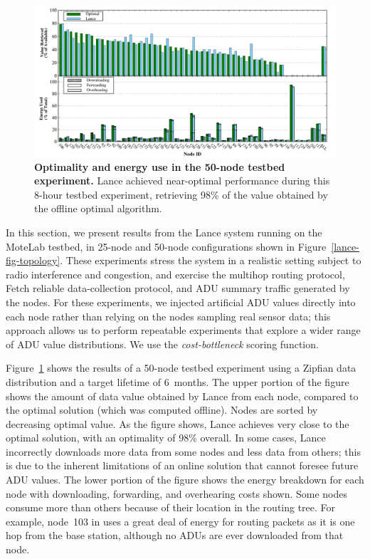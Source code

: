 \begin{figure}[t]
\begin{center}
\includegraphics[width=1.0\hsize]{./4-lance/figs/big.pdf}
\end{center}

\caption{\textbf{Optimality and energy use in the 50-node testbed
experiment.} Lance achieved near-optimal performance during this 8-hour
testbed experiment, retrieving 98\% of the value obtained by the offline
optimal algorithm.}

\label{lance-fig-big}
\end{figure}

In this section, we present results from the Lance system running on the
MoteLab testbed, in 25-node and 50-node configurations shown in
Figure~\ref{lance-fig-topology}. These experiments stress the system in a
realistic setting subject to radio interference and congestion, and exercise
the multihop routing protocol, Fetch reliable data-collection protocol, and
ADU summary traffic generated by the nodes. For these experiments, we
injected artificial ADU values directly into each node rather than relying on
the nodes sampling real sensor data; this approach allows us to perform
repeatable experiments that explore a wider range of ADU value distributions.
We use the \textit{cost-bottleneck} scoring function.

Figure~\ref{lance-fig-big} shows the results of a 50-node testbed experiment
using a Zipfian data distribution and a target lifetime of 6~months. The
upper portion of the figure shows the amount of data value obtained by Lance
from each node, compared to the optimal solution (which was computed
offline). Nodes are sorted by decreasing optimal value. As the figure shows,
Lance achieves very close to the optimal solution, with an optimality of 98\%
overall. In some cases, Lance incorrectly downloads more data from some nodes
and less data from others; this is due to the inherent limitations of an
online solution that cannot foresee future ADU values. The lower portion of
the figure shows the energy breakdown for each node with downloading,
forwarding, and overhearing costs shown. Some nodes consume more than others
because of their location in the routing tree. For example, node~103 in uses
a great deal of energy for routing packets as it is one hop from the base
station, although no ADUs are ever downloaded from that node.

